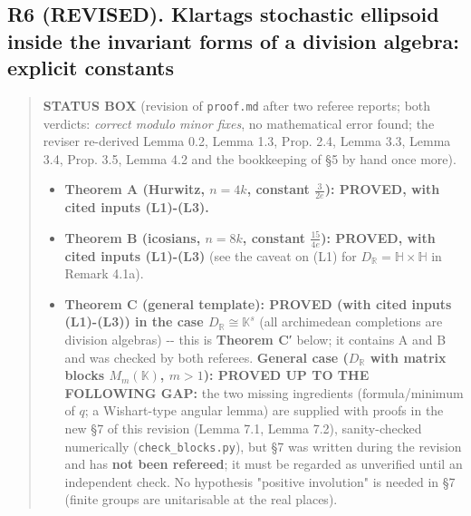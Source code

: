 \hypertarget{r6-revised.-klartags-stochastic-ellipsoid-inside-the-invariant-forms-of-a-division-algebra-explicit-constants}{%
\subsection*{R6 (REVISED). Klartag\textquotesingle s stochastic ellipsoid inside the invariant forms of a division algebra: explicit constants}\label{r6-revised.-klartags-stochastic-ellipsoid-inside-the-invariant-forms-of-a-division-algebra-explicit-constants}}

\begin{quote}
\textbf{STATUS BOX} (revision of \texttt{proof.md} after two referee reports; both verdicts: \emph{correct modulo minor fixes}, no mathematical error found; the reviser re-derived Lemma 0.2, Lemma 1.3, Prop. 2.4, Lemma 3.3, Lemma 3.4, Prop. 3.5, Lemma 4.2 and the bookkeeping of §5 by hand once more).

\begin{itemize}
\tightlist
\item
  \textbf{Theorem A (Hurwitz, \(n=4k\), constant \(\frac3{2e}\)): PROVED, with cited inputs (L1)-(L3).}
\item
  \textbf{Theorem B (icosians, \(n=8k\), constant \(\frac{15}{4e}\)): PROVED, with cited inputs (L1)-(L3)} (see the caveat on (L1) for \(D_\mathbb R=\mathbb H\times\mathbb H\) in Remark 4.1a).
\item
  \textbf{Theorem C (general template): PROVED (with cited inputs (L1)-(L3)) in the case \(D_\mathbb R\cong\mathbb K^s\)} (all archimedean completions are division algebras) -\/- this is \textbf{Theorem C′} below; it contains A and B and was checked by both referees. \textbf{General case (\(D_{\mathbb R}\) with matrix blocks \(M_m(\mathbb K)\), \(m>1\)): PROVED UP TO THE FOLLOWING GAP:} the two missing ingredients (formula/minimum of \(q\); a Wishart-type angular lemma) are supplied with proofs in the new §7 of this revision (Lemma 7.1, Lemma 7.2), sanity-checked numerically (\texttt{check\_blocks.py}), but §7 was written during the revision and has \textbf{not been refereed}; it must be regarded as unverified until an independent check. No hypothesis "positive involution" is needed in §7 (finite groups are unitarisable at the real places).
\end{itemize}


\end{quote}
